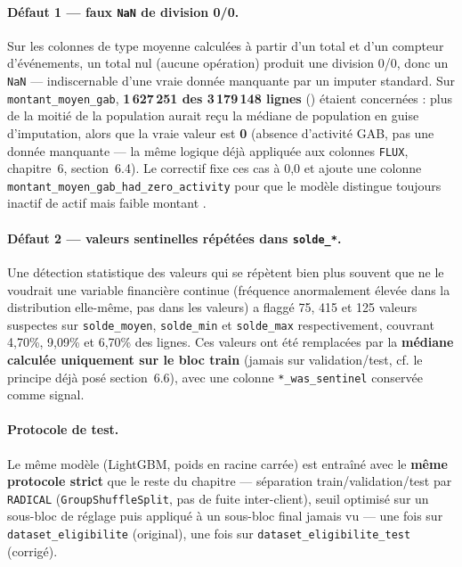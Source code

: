 \documentclass[11pt,a4paper]{report}
\begin{document}
\paragraph{Défaut 1 — faux \texttt{NaN} de division 0/0.}
Sur les colonnes de type \og moyenne \fg{} calculées à partir d'un total
et d'un compteur d'événements, un total nul (aucune opération) produit
une division 0/0, donc un \texttt{NaN} — indiscernable d'une vraie donnée
manquante par un imputer standard. Sur \texttt{montant\_moyen\_gab},
\textbf{1\,627\,251 des 3\,179\,148 lignes} ()
étaient concernées : plus de la moitié de la population aurait reçu la
médiane de population en guise d'imputation, alors que la vraie valeur
est \textbf{0} (absence d'activité GAB, pas une donnée manquante — la
même logique déjà appliquée aux colonnes \texttt{FLUX}, chapitre~6,
section~6.4). Le correctif fixe ces cas à 0,0 et ajoute une colonne
\texttt{montant\_moyen\_gab\_had\_zero\_activity} pour que le modèle
distingue toujours \og inactif \fg{} de \og actif mais faible montant \fg.

\paragraph{Défaut 2 — valeurs sentinelles répétées dans \texttt{solde\_*}.}
Une détection statistique des valeurs qui se répètent bien plus souvent
que ne le voudrait une variable financière continue (fréquence
anormalement élevée dans la distribution elle-même, pas dans les valeurs)
a flaggé 75, 415 et 125 valeurs suspectes sur \texttt{solde\_moyen},
\texttt{solde\_min} et \texttt{solde\_max} respectivement, couvrant
4,70\%, 9,09\% et 6,70\% des lignes. Ces valeurs ont été remplacées par la
\textbf{médiane calculée uniquement sur le bloc train} (jamais sur
validation/test, cf. le principe déjà posé section~6.6), avec une colonne
\texttt{*\_was\_sentinel} conservée comme signal.

\paragraph{Protocole de test.} Le même modèle (LightGBM, poids en racine
carrée) est entraîné avec le \textbf{même protocole strict} que le reste
du chapitre — séparation train/validation/test par \texttt{RADICAL}
(\texttt{GroupShuffleSplit}, pas de fuite inter-client), seuil optimisé
sur un sous-bloc de réglage puis appliqué à un sous-bloc final jamais vu
— une fois sur \texttt{dataset\_eligibilite} (original), une fois sur
\texttt{dataset\_eligibilite\_test} (corrigé).
\end{document}
